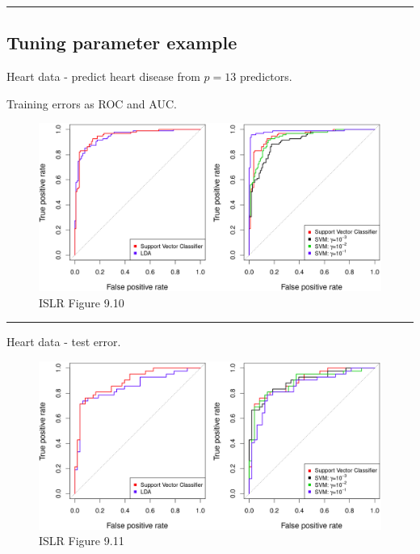 \documentclass[]{article}
\begin{document}
\begin{center}\rule{0.5\linewidth}{\linethickness}\end{center}

\hypertarget{tuning-parameter-example}{%
\subsection{Tuning parameter example}\label{tuning-parameter-example}}

Heart data - predict heart disease from \(p=13\) predictors.

Training errors as ROC and AUC.

\begin{figure}
\centering
\includegraphics{../ISLR/Chapter9/9.10.png}
\caption{ISLR Figure 9.10}
\end{figure}

\begin{center}\rule{0.5\linewidth}{\linethickness}\end{center}

Heart data - test error.

\begin{figure}
\centering
\includegraphics{../ISLR/Chapter9/9.11.png}
\caption{ISLR Figure 9.11}
\end{figure}
\end{document}
